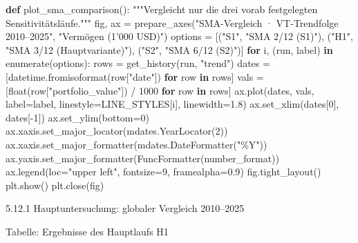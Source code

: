 \documentclass[
  ngerman,
  a4paper,
  DIV=11,
  oneside]{scrreprt}
\newenvironment{Shaded}{\begin{snugshade}}{\end{snugshade}}
\newcommand{\BuiltInTok}[1]{\textcolor[rgb]{0.00,0.23,0.31}{#1}}
\newcommand{\CommentTok}[1]{\textcolor[rgb]{0.37,0.37,0.37}{#1}}
\newcommand{\ControlFlowTok}[1]{\textcolor[rgb]{0.00,0.23,0.31}{\textbf{#1}}}
\newcommand{\DecValTok}[1]{\textcolor[rgb]{0.68,0.00,0.00}{#1}}
\newcommand{\FloatTok}[1]{\textcolor[rgb]{0.68,0.00,0.00}{#1}}
\newcommand{\KeywordTok}[1]{\textcolor[rgb]{0.00,0.23,0.31}{\textbf{#1}}}
\newcommand{\NormalTok}[1]{\textcolor[rgb]{0.00,0.23,0.31}{#1}}
\newcommand{\OperatorTok}[1]{\textcolor[rgb]{0.37,0.37,0.37}{#1}}
\newcommand{\StringTok}[1]{\textcolor[rgb]{0.13,0.47,0.30}{#1}}
\begin{document}
\begin{Shaded}
\begin{Highlighting}[]
\KeywordTok{def}\NormalTok{ plot\_sma\_comparison():}
    \CommentTok{"""Vergleicht nur die drei vorab festgelegten Sensitivitätsläufe."""}
\NormalTok{    fig, ax }\OperatorTok{=}\NormalTok{ prepare\_axes(}\StringTok{"SMA{-}Vergleich · VT{-}Trendfolge 2010–2025"}\NormalTok{, }\StringTok{"Vermögen (1’000 USD)"}\NormalTok{)}
\NormalTok{    options }\OperatorTok{=}\NormalTok{ [(}\StringTok{"S1"}\NormalTok{, }\StringTok{"SMA 2/12 (S1)"}\NormalTok{), (}\StringTok{"H1"}\NormalTok{, }\StringTok{"SMA 3/12 (Hauptvariante)"}\NormalTok{),}
\NormalTok{               (}\StringTok{"S2"}\NormalTok{, }\StringTok{"SMA 6/12 (S2)"}\NormalTok{)]}
    \ControlFlowTok{for}\NormalTok{ i, (run, label) }\KeywordTok{in} \BuiltInTok{enumerate}\NormalTok{(options):}
\NormalTok{        rows }\OperatorTok{=}\NormalTok{ get\_history(run, }\StringTok{"trend"}\NormalTok{)}
\NormalTok{        dates }\OperatorTok{=}\NormalTok{ [datetime.fromisoformat(row[}\StringTok{"date"}\NormalTok{]) }\ControlFlowTok{for}\NormalTok{ row }\KeywordTok{in}\NormalTok{ rows]}
\NormalTok{        vals }\OperatorTok{=}\NormalTok{ [}\BuiltInTok{float}\NormalTok{(row[}\StringTok{"portfolio\_value"}\NormalTok{]) }\OperatorTok{/} \DecValTok{1000} \ControlFlowTok{for}\NormalTok{ row }\KeywordTok{in}\NormalTok{ rows]}
\NormalTok{        ax.plot(dates, vals, label}\OperatorTok{=}\NormalTok{label, linestyle}\OperatorTok{=}\NormalTok{LINE\_STYLES[i], linewidth}\OperatorTok{=}\FloatTok{1.8}\NormalTok{)}
\NormalTok{    ax.set\_xlim(dates[}\DecValTok{0}\NormalTok{], dates[}\OperatorTok{{-}}\DecValTok{1}\NormalTok{])}
\NormalTok{    ax.set\_ylim(bottom}\OperatorTok{=}\DecValTok{0}\NormalTok{)}
\NormalTok{    ax.xaxis.set\_major\_locator(mdates.YearLocator(}\DecValTok{2}\NormalTok{))}
\NormalTok{    ax.xaxis.set\_major\_formatter(mdates.DateFormatter(}\StringTok{"\%Y"}\NormalTok{))}
\NormalTok{    ax.yaxis.set\_major\_formatter(FuncFormatter(number\_format))}
\NormalTok{    ax.legend(loc}\OperatorTok{=}\StringTok{"upper left"}\NormalTok{, fontsize}\OperatorTok{=}\DecValTok{9}\NormalTok{, framealpha}\OperatorTok{=}\FloatTok{0.9}\NormalTok{)}
\NormalTok{    fig.tight\_layout()}
\NormalTok{    plt.show()}
\NormalTok{    plt.close(fig)}
\end{Highlighting}
\end{Shaded}

5.12.1 Hauptuntersuchung: globaler Vergleich 2010--2025

Tabelle: Ergebnisse des Hauptlaufs H1
\end{document}
